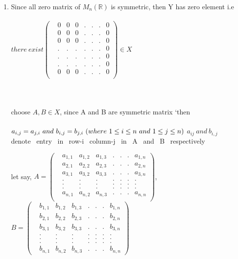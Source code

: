 \documentclass[45pt]{article}
\begin{document}
\begin{enumerate}
\item Since all zero matrix of $M_n(\mathbb{R})$  is symmetric, then Y has zero element i.e \\ \\
$ there ~ exist \begin{pmatrix}
    & 0 & 0 & 0 &.&.&.& 0 \\
    & 0 & 0 & 0 &.&.&.& 0\\
    & 0 & 0 & 0 &.&.&.& 0\\
    & . & . & . &.&.&.& 0\\
    & . & . & . &.&.&.& 0\\
    & . & . & . &.&.&.& 0\\
    & 0 & 0 & 0 &.&.&.& 0\\
    \end{pmatrix} 
    \in X
      $ \\\\
 \\\\ 

choose $A, B \in X $, since A and B are symmetric matrix     `then \\\\
$ a_{i,j}=a_{j,i} ~ and ~ b_{i,j}=b_{j,i} ~ (where ~ 1 \leq i \leq n ~and ~1 \leq j \leq n )\\$
$a_{ij} ~ and ~ b_{i,j}$~ denote~ entry~ in~ row-i ~column-j ~in ~A~ and ~B~ respectively

let say,
$A= \begin{pmatrix}
    & a_{1,1} & a_{1,2} & a_{1,3} &.&.&.& a_{1,n}  \\
    & a_{2,1} & a_{2,2} & a_{2,3} &.&.&.& a_{2,n}  \\
    & a_{3,1} & a_{3,2} & a_{3,3} &.&.&.& a_{3,n}  \\
    & . & . & . &.&.&.&.\\
    & . & . & . &.&.&.&.\\
    & . & . & . &.&.&.&.\\
    & a_{n,1} & a_{n,2} & a_{n,3} &.&.&.& a_{n,n}  \\
    \end{pmatrix}$, $
    B=\begin{pmatrix}
        & b_{1,1} & b_{1,2} & b_{1,3} &.&.&.& b_{1,n}  \\
        & b_{2,1} & b_{2,2} & b_{2,3} &.&.&.& b_{2,n}  \\
        & b_{3,1} & b_{3,2} & b_{3,3} &.&.&.& b_{3,n}  \\
        & . & . & . &.&.&.&.\\
        & . & . & . &.&.&.&.\\
        & . & . & . &.&.&.&.\\
        & b_{n,1} & b_{n,2} & b_{n,3} &.&.&.& b_{n,n} 
     \end{pmatrix}
    $\\\\



\end{enumerate}
\end{document}
